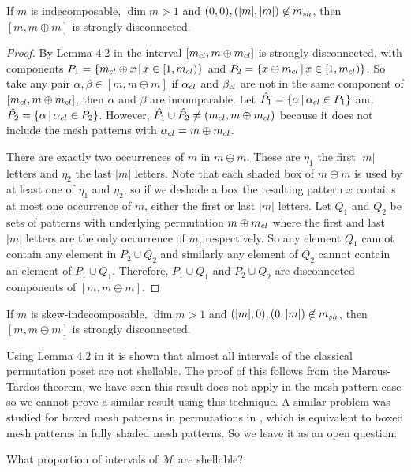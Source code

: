 \documentclass[11pt,a4paper,oneside]{article}
\begin{document}
\begin{lem}
If $m$ is indecomposable, $\dim m > 1$ and $(0,0),(|m|,|m|)\not\in m_{sh}$, then
$[m,m\oplus m]$ is strongly disconnected.
\begin{proof}
By Lemma 4.2 in \cite{McSt13} the interval $[m_{cl},m\oplus m_{cl}]$ is strongly disconnected,
with components $P_1=\{m_{cl}\oplus x\,|\,x\in [1,m_{cl})\}$ and
$P_2=\{x\oplus m_{cl}\,|\,x\in [1,m_{cl})\}$. So take any pair $\alpha,\beta\in[m,m\oplus m]$
if $\alpha_{cl}$ and $\beta_{cl}$ are not in the same component of  $[m_{cl},m\oplus m_{cl}]$,
then $\alpha$ and $\beta$ are incomparable. Let $\hat{P_1}=\{\alpha\,|\,\alpha_{cl}\in P_1\}$
and $\hat{P_2}=\{\alpha\,|\,\alpha_{cl}\in P_2\}$. However, $\hat{P_1}\cup\hat{P_2}\not=(m_{cl},m\oplus m_{cl})$
because it does not include the mesh patterns with $\alpha_{cl}=m\oplus m_{cl}$.

There are exactly two occurrences of $m$ in $m\oplus m$. These are $\eta_1$ the first $|m|$ letters
and $\eta_2$ the last $|m|$ letters. Note that each shaded box of $m\oplus m$ is used by at least one
of $\eta_1$ and $\eta_2$, so if we deshade a box the resulting pattern $x$ contains at most one occurrence of $m$,
either the first or last $|m|$ letters. Let $Q_1$ and $Q_2$ be sets of patterns with underlying permutation
$m\oplus m_{cl}$ where the first and last $|m|$ letters are the only occurrence of $m$, respectively. So any
element $Q_1$ cannot contain any element in $P_2\cup Q_2$ and similarly any element of $Q_2$ cannot
contain an element of $P_1\cup Q_1$. Therefore, $P_1\cup Q_1$ and $P_2\cup Q_2$ are disconnected components of
$[m,m\oplus m]$.
\end{proof}
\end{lem}
\begin{cor}
If $m$ is skew-indecomposable, $\dim m>1$ and $(|m|,0),(0,|m|)\not\in m_{sh}$, then
$[m,m\ominus m]$ is strongly disconnected.
\end{cor}

Using Lemma 4.2 in \cite{McSt13} it is shown that
almost all intervals of the classical permutation poset are not shellable. The
proof of this follows from the Marcus-Tardos theorem, we have seen this result
does not apply in the mesh pattern case so we cannot prove a similar result
using this technique.  A similar problem was studied for boxed mesh patterns in
permutations in \cite{AKV13}, which is equivalent to boxed mesh patterns in
fully shaded mesh patterns. So we leave it as an open question:

\begin{que}
What proportion of intervals of $\mathcal{M}$ are shellable?
\end{que}
\end{document}
